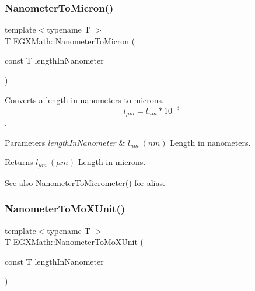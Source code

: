 \subsubsection{\texorpdfstring{Nanometer\+To\+Micron()}{NanometerToMicron()}}
{\footnotesize\ttfamily template$<$typename T $>$ \\
T E\+G\+X\+Math\+::\+Nanometer\+To\+Micron (\begin{DoxyParamCaption}\item[{const T}]{length\+In\+Nanometer }\end{DoxyParamCaption})}



Converts a length in nanometers to microns. \[ l_{\mu m}=l_{nm} * 10^{-3} \]. 


\begin{DoxyParams}{Parameters}
{\em length\+In\+Nanometer} & $ l_{nm}\ (nm)$ Length in nanometers. \\
\hline
\end{DoxyParams}
\begin{DoxyReturn}{Returns}
$ l_{\mu m}\ (\mu m)$ Length in microns. 
\end{DoxyReturn}
\begin{DoxySeeAlso}{See also}
\mbox{\hyperlink{group___e_g_x_math-_conversions-_length_conversions-_s_i-_nanometer-_s_i_gaa539df5d709bface86429c8a25d7f6e1}{Nanometer\+To\+Micrometer()}} for alias. 
\end{DoxySeeAlso}
\mbox{\label{group___e_g_x_math-_conversions-_length_conversions-_s_i-_nanometer-_non-_s_i_gacc6d7fa95c35687718c816df3c95c7b5}} 
\subsubsection{\texorpdfstring{Nanometer\+To\+Mo\+X\+Unit()}{NanometerToMoXUnit()}}
{\footnotesize\ttfamily template$<$typename T $>$ \\
T E\+G\+X\+Math\+::\+Nanometer\+To\+Mo\+X\+Unit (\begin{DoxyParamCaption}\item[{const T}]{length\+In\+Nanometer }\end{DoxyParamCaption})}



